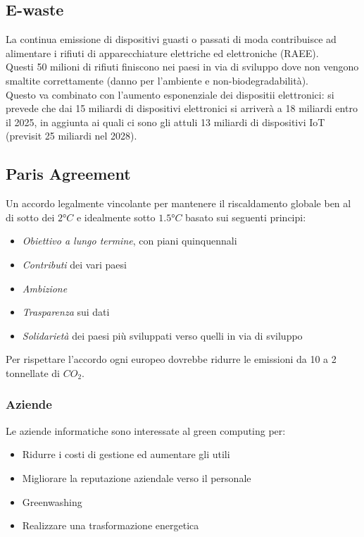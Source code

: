 \subsection{E-waste}
La continua emissione di dispositivi guasti o passati di moda contribuisce ad alimentare i rifiuti di apparecchiature elettriche ed elettroniche (RAEE). \\
Questi 50 milioni di rifiuti finiscono nei paesi in via di sviluppo dove non vengono smaltite correttamente (danno per l'ambiente e non-biodegradabilità).\\
Questo va combinato con l'aumento esponenziale dei dispositii elettronici: si prevede che dai 15 miliardi di dispositivi elettronici si arriverà a 18 miliardi entro il 2025, in aggiunta ai quali ci sono gli attuli 13 miliardi di dispositivi IoT (previsit 25 miliardi nel 2028).

\subsection{Paris Agreement}
Un accordo legalmente vincolante per mantenere il riscaldamento globale ben al di sotto dei $2°C$ e idealmente sotto $1.5°C$ basato sui seguenti principi:
\begin{itemize}
	\item \textit{Obiettivo a lungo termine}, con piani quinquennali
	\item \textit{Contributi} dei vari paesi
	\item \textit{Ambizione}
	\item \textit{Trasparenza} sui dati
	\item \textit{Solidarietà} dei paesi più sviluppati verso quelli in via di sviluppo
\end{itemize}
Per rispettare l'accordo ogni europeo dovrebbe ridurre le emissioni da 10 a 2 tonnellate di $CO_2$.

\subsubsection{Aziende}
Le aziende informatiche sono interessate al green computing per:
\begin{itemize}
	\item Ridurre i costi di gestione ed aumentare gli utili
	\item Migliorare la reputazione aziendale verso il personale
	\item Greenwashing
	\item Realizzare una trasformazione energetica
\end{itemize}